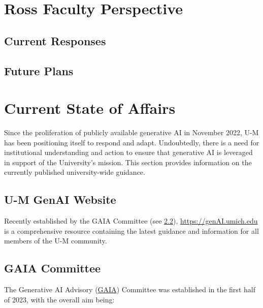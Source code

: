 \documentclass[
]{book}
\begin{document}
\hypertarget{ross-faculty-perspective}{%
\chapter{Ross Faculty Perspective}\label{ross-faculty-perspective}}

\hypertarget{current-responses}{%
\section{Current Responses}\label{current-responses}}

\hypertarget{future-plans}{%
\section{Future Plans}\label{future-plans}}

\hypertarget{current-state-of-affairs}{%
\chapter{Current State of Affairs}\label{current-state-of-affairs}}

Since the proliferation of publicly available generative AI in November 2022, U-M has been positioning itself to respond and adapt. Undoubtedly, there is a need for institutional understanding and action to ensure that generative AI is leveraged in support of the University's mission. This section provides information on the currently published university-wide guidance.

\hypertarget{u-m-genai-website}{%
\section{U-M GenAI Website}\label{u-m-genai-website}}

Recently established by the GAIA Committee (see \ref{gaia-committee}), \url{https://genAI.umich.edu} is a comprehensive resource containing the latest guidance and information for all members of the U-M community.

\hypertarget{gaia-committee}{%
\section{GAIA Committee}\label{gaia-committee}}

The Generative AI Advisory (\href{https://it.umich.edu/strategy-planning/gaia}{GAIA}) Committee was established in the first half of 2023, with the overall aim being:
\end{document}
